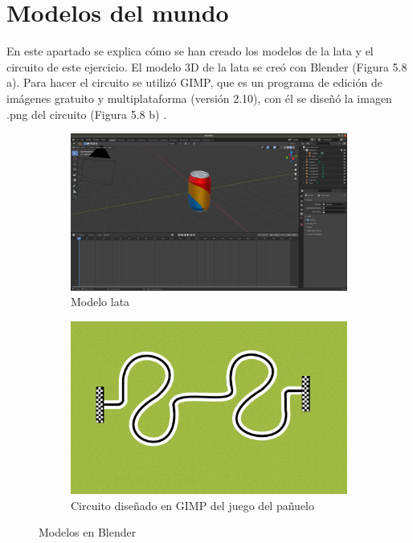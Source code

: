 \section{Modelos del mundo}
En este apartado se explica cómo se han creado los modelos de la lata y el circuito de este ejercicio.
El modelo 3D de la lata se creó con Blender (Figura 5.8 a). Para hacer el circuito se utilizó  GIMP, que es un programa de edición de imágenes gratuito y multiplataforma (versión 2.10), con él se diseñó la imagen .png del circuito (Figura 5.8 b) .
 
\begin{figure}[H]
  \begin{subfigure}[b]{0.5\textwidth}
  \centering
    \includegraphics[width=1\textwidth, height=0.6\textwidth]{chapters/images/lata.png}
    \caption{Modelo lata}
    \label{fig:f1}
  \end{subfigure}
  \hfill
  \begin{subfigure}[b]{0.5\textwidth}
  \centering
     \includegraphics[width=1\textwidth, height=0.6\textwidth]{chapters/images/handkerchief.png}
     \caption{Circuito diseñado en GIMP del juego del pañuelo} 
    \label{fig:f2}
 
  \end{subfigure}
  \caption{Modelos en Blender}
\end{figure}
 
